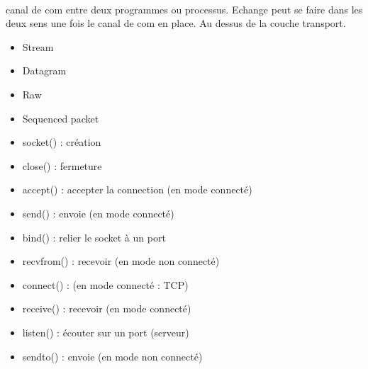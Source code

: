  \\

 canal de com entre deux programmes ou processus. Echange peut se faire dans les deux sens une fois le canal de com en place. Au dessus de la couche transport.\\

\begin{itemize}
	\item Stream
	\item Datagram
	\item Raw
	\item Sequenced packet
\end{itemize}

\begin{itemize}
	\item socket() : création
	\item close() : fermeture
	\item accept() : accepter la connection (en mode connecté)
	\item send() : envoie (en mode connecté)
	\item bind() : relier le socket à un port
	\item recvfrom() : recevoir (en mode non connecté)
	\item connect() : (en mode connecté : TCP)
	\item receive() : recevoir (en mode connecté)
	\item listen() : écouter sur un port (serveur)
	\item sendto() : envoie (en mode non connecté)
\end{itemize}

